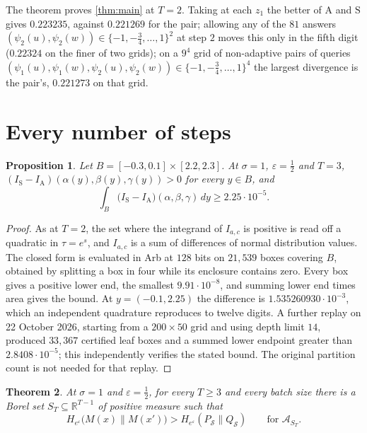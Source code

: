 \documentclass[11pt]{amsart}
\newtheorem{theorem}{Theorem}[section]
\newtheorem{proposition}[theorem]{Proposition}
\theoremstyle{definition}
\theoremstyle{remark}
\newcommand{\R}{\mathbb R}
\newcommand{\ANTI}{\mathrm{A}}
\newcommand{\SAME}{\mathrm{S}}
\newcommand{\He}{H_{e^{\varepsilon}}}
\begin{document}
The theorem proves \cref{thm:main} at $T=2$. Taking at each $z_1$ the better of $\ANTI$ and $\SAME$ gives $0.223235$, against $0.221269$ for the pair; allowing any of the $81$ answers $(\psi_2(u),\psi_2(w))\in\{-1,-\frac34,\dots,1\}^2$ at step $2$ moves this only in the fifth digit ($0.22324$ on the finer of two grids); on a $9^4$ grid of non-adaptive pairs of queries $(\psi_1(u),\psi_1(w),\psi_2(u),\psi_2(w))\in\{-1,-\frac34,\dots,1\}^4$ the largest divergence is the pair's, $0.221273$ on that grid.

\section{Every number of steps}\label{sec:allT}

\begin{proposition}\label{prop:T3}
Let $B=[-0.3,0.1]\times[2.2,2.3]$. At $\sigma=1$, $\varepsilon=\frac12$ and $T=3$, $(I_{\SAME}-I_{\ANTI})(\alpha(y),\beta(y),\gamma(y))>0$ for every $y\in B$, and
\[
\int_B\bigl(I_{\SAME}-I_{\ANTI}\bigr)(\alpha,\beta,\gamma)\,dy\ge2.25\cdot10^{-5}.
\]
\end{proposition}

\begin{proof}
As at $T=2$, the set where the integrand of $I_{a,c}$ is positive is read off a quadratic in $\tau=e^{s}$, and $I_{a,c}$ is a sum of differences of normal distribution values. The closed form is evaluated in Arb at $128$ bits on $21{,}539$ boxes covering $B$, obtained by splitting a box in four while its enclosure contains zero. Every box gives a positive lower end, the smallest $9.91\cdot10^{-8}$, and summing lower end times area gives the bound. At $y=(-0.1,2.25)$ the difference is $1.535260930\cdot10^{-3}$, which an independent quadrature reproduces to twelve digits. A further replay on 22 October 2026, starting from a $200\times50$ grid and using depth limit $14$, produced $33{,}367$ certified leaf boxes and a summed lower endpoint greater than $2.8408\cdot10^{-5}$; this independently verifies the stated bound. The original partition count is not needed for that replay.
\end{proof}

\begin{theorem}\label{thm:allT}
At $\sigma=1$ and $\varepsilon=\frac12$, for every $T\ge3$ and every batch size there is a Borel set $S_T\subseteq\R^{T-1}$ of positive measure such that
\[
\He\bigl(M(x)\|M(x')\bigr)>\He(P_{\mathcal S}\|Q_{\mathcal S})\qquad\text{for }\mathcal A_{S_T}.
\]
\end{theorem}
\end{document}
